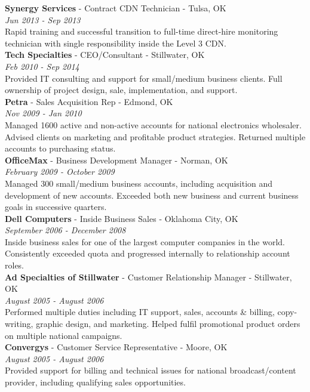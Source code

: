 \documentclass[10pt]{article} %
\begin{document}
{
\textbf{Synergy Services} - Contract CDN Technician - Tulsa, OK\\
\textit{Jun 2013 - Sep 2013}\\ 
Rapid training and successful transition to full-time direct-hire monitoring technician with single responsibility inside the Level 3 CDN.\\

\textbf{Tech Specialties} - CEO/Consultant - Stillwater, OK\\
\textit{Feb 2010 - Sep 2014}\\ 
Provided IT consulting and support for small/medium business clients. Full ownership of project design, sale, implementation, and support.\\

\textbf{Petra} - Sales Acquisition Rep - Edmond, OK\\
\textit{Nov 2009 - Jan 2010}\\ 
Managed 1600 active and non-active accounts for national electronics wholesaler. Advised clients on marketing and profitable product strategies. Returned multiple accounts to purchasing status.\\

\textbf{OfficeMax} - Business Development Manager - Norman, OK\\
\textit{February 2009 - October 2009}\\ 
Managed 300 small/medium business accounts, including acquisition and development of new accounts. Exceeded both new business and current business goals in successive quarters.\\

\textbf{Dell Computers} - Inside Business Sales - Oklahoma City, OK\\
\textit{September 2006 - December 2008}\\ 
Inside business sales for one of the largest computer companies in the world. Consistently exceeded quota and progressed internally to relationship account roles.\\

\textbf{Ad Specialties of Stillwater} - Customer Relationship Manager - Stillwater, OK\\
\textit{August 2005 - August 2006}\\
Performed multiple duties including IT support, sales, accounts \& billing, copy-writing, graphic design, and marketing. Helped fulfil promotional product orders on multiple national campaigns.\\

\textbf{Convergys} - Customer Service Representative - Moore, OK\\
\textit{August 2005 - August 2006}\\
Provided support for billing and technical issues for national broadcast/content provider, including qualifying sales opportunities.\\

}
\end{document}
